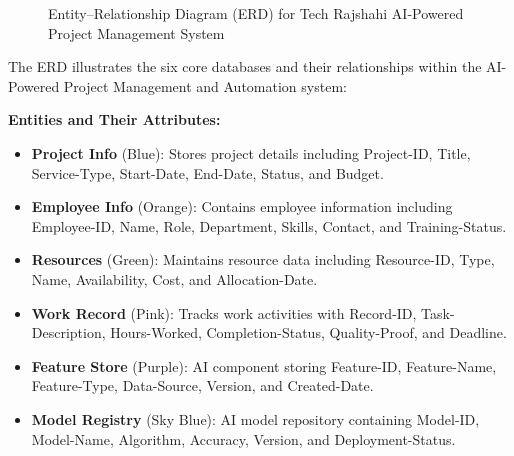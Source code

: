 \documentclass[12pt,a4paper]{article}
\begin{document}
\begin{figure}[H]
\caption{Entity–Relationship Diagram (ERD) for Tech Rajshahi AI-Powered Project Management System}
\label{fig:erd_diagram}
\end{figure}

The ERD illustrates the six core databases and their relationships within the AI-Powered Project Management and Automation system:

\textbf{Entities and Their Attributes:}
\begin{itemize}
    \item \textbf{Project Info} (Blue): Stores project details including Project-ID, Title, Service-Type, Start-Date, End-Date, Status, and Budget.
    
    \item \textbf{Employee Info} (Orange): Contains employee information including Employee-ID, Name, Role, Department, Skills, Contact, and Training-Status.
    
    \item \textbf{Resources} (Green): Maintains resource data including Resource-ID, Type, Name, Availability, Cost, and Allocation-Date.
    
    \item \textbf{Work Record} (Pink): Tracks work activities with Record-ID, Task-Description, Hours-Worked, Completion-Status, Quality-Proof, and Deadline.
    
    \item \textbf{Feature Store} (Purple): AI component storing Feature-ID, Feature-Name, Feature-Type, Data-Source, Version, and Created-Date.
    
    \item \textbf{Model Registry} (Sky Blue): AI model repository containing Model-ID, Model-Name, Algorithm, Accuracy, Version, and Deployment-Status.
\end{itemize}
\end{document}
